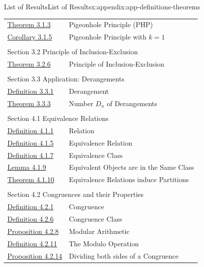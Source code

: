 \documentclass[oneside,10pt,]{book}
\numberwithin{equation}{section}
\begin{document}
\begin{appendixptx}{List of Results}{}{List of Results}{}{}{x:appendix:app-definitions-theorems}
\begin{longtable}[l]{ll}
\hyperref[x:theorem:thm-php]{Theorem 3.1.3}& Pigeonhole Principle (PHP)\\
\hyperref[x:corollary:cor-php]{Corollary 3.1.5}& Pigeonhole Principle with \(k=1\)\\
\multicolumn{2}{l}{\null}\\[1.5ex] \multicolumn{2}{l}{\large Section 3.2 Principle of Inclusion-Exclusion}\\[0.5ex]
\hyperref[x:theorem:thm-pie]{Theorem 3.2.6}& Principle of Inclusion-Exclusion\\
\multicolumn{2}{l}{\null}\\[1.5ex] \multicolumn{2}{l}{\large Section 3.3 Application: Derangements}\\[0.5ex]
\hyperref[x:definition:def-derangement]{Definition 3.3.1}& Derangement\\
\hyperref[x:theorem:thm-derangement]{Theorem 3.3.3}& Number \(D_n\) of Derangements\\
\multicolumn{2}{l}{\null}\\[1.5ex] \multicolumn{2}{l}{\large Section 4.1 Equivalence Relations}\\[0.5ex]
\hyperref[x:definition:def-relation]{Definition 4.1.1}& Relation\\
\hyperref[x:definition:def-equivalence-relation]{Definition 4.1.5}& Equivalence Relation\\
\hyperref[x:definition:def-equivalence-class]{Definition 4.1.7}& Equivalence Class\\
\hyperref[x:lemma:lemma-equivalence-class]{Lemma 4.1.9}& Equivalent Objects are in the Same Class\\
\hyperref[x:theorem:thm-equivalence-partition]{Theorem 4.1.10}& Equivalence Relations induce Partitions\\
\multicolumn{2}{l}{\null}\\[1.5ex] \multicolumn{2}{l}{\large Section 4.2 Congruences and their Properties}\\[0.5ex]
\hyperref[x:definition:def-congruence]{Definition 4.2.1}& Congruence\\
\hyperref[x:definition:def-congruence-class]{Definition 4.2.6}& Congruence Class\\
\hyperref[x:proposition:prop-cong-modular-arithmetic]{Proposition 4.2.8}& Modular Arithmetic\\
\hyperref[x:definition:def-cong-modulo]{Definition 4.2.11}& The Modulo Operation\\
\hyperref[x:proposition:prop-cong-division]{Proposition 4.2.14}& Dividing both sides of a Congruence\\

\end{longtable}
\end{appendixptx}
\end{document}
